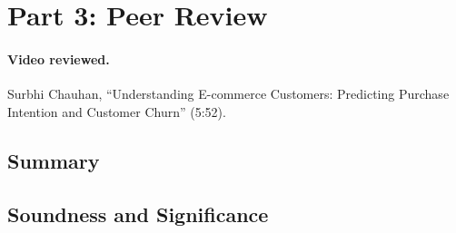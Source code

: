 
\section{Part 3: Peer Review}
\label{sec:part3}

\paragraph{Video reviewed.} Surbhi Chauhan, ``Understanding E-commerce Customers: Predicting Purchase Intention and Customer Churn'' (5:52).

\subsection{Summary}


\subsection{Soundness and Significance}

